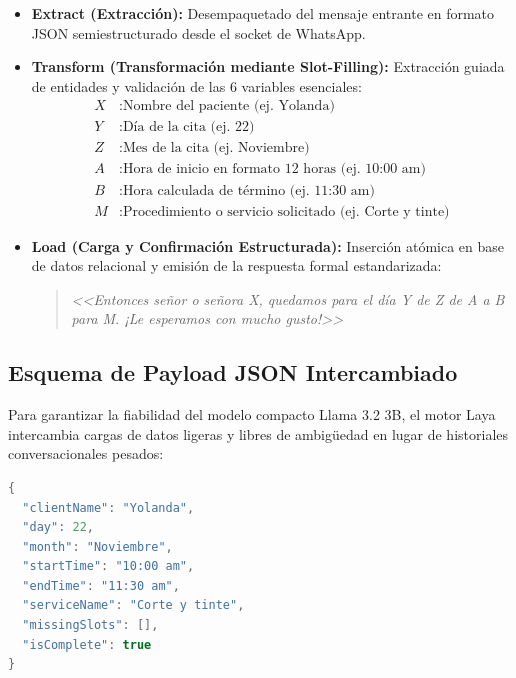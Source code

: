 \documentclass[12pt,a4paper]{report}
\begin{document}
\begin{itemize}[leftmargin=1.5em]
    \item \textbf{Extract (Extracción):} Desempaquetado del mensaje entrante en formato JSON semiestructurado desde el socket de WhatsApp.
    \item \textbf{Transform (Transformación mediante Slot-Filling):} Extracción guiada de entidades y validación de las 6 variables esenciales:
    \begin{align*}
        X &: \text{Nombre del paciente (ej. Yolanda)} \\
        Y &: \text{Día de la cita (ej. 22)} \\
        Z &: \text{Mes de la cita (ej. Noviembre)} \\
        A &: \text{Hora de inicio en formato 12 horas (ej. 10:00 am)} \\
        B &: \text{Hora calculada de término (ej. 11:30 am)} \\
        M &: \text{Procedimiento o servicio solicitado (ej. Corte y tinte)}
    \end{align*}
    \item \textbf{Load (Carga y Confirmación Estructurada):} Inserción atómica en base de datos relacional y emisión de la respuesta formal estandarizada:
    \begin{quote}
        \textit{<<Entonces señor o señora X, quedamos para el día Y de Z de A a B para M. ¡Le esperamos con mucho gusto!>>}
    \end{quote}
\end{itemize}

\subsection{Esquema de Payload JSON Intercambiado}
Para garantizar la fiabilidad del modelo compacto Llama 3.2 3B, el motor Laya intercambia cargas de datos ligeras y libres de ambigüedad en lugar de historiales conversacionales pesados:

\begin{lstlisting}[language=Java, caption={Estructura de Payload JSON utilizado para el llenado de slots en Laya.}]
{
  "clientName": "Yolanda",
  "day": 22,
  "month": "Noviembre",
  "startTime": "10:00 am",
  "endTime": "11:30 am",
  "serviceName": "Corte y tinte",
  "missingSlots": [],
  "isComplete": true
}
\end{lstlisting}

\end{document}
